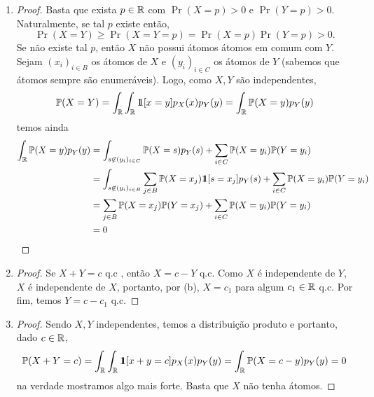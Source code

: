 \begin{enumerate}[label=(\alph*)]
	\item
		\begin{proof}
			Basta que exista $p \in \mathbb{R}$ com $\Pr(X = p) > 0$ e $\Pr(Y = p) >
			0$. Naturalmente,
			se tal $p$ existe então,
			\[
				\Pr(X = Y) \geq \Pr(X = Y = p) = \Pr(X=p) \Pr(Y = p) > 0.
			\]
			Se não existe tal $p$, então $X$ não possui átomos átomos em comum com $Y$.
			Sejam $(x_i)_{i \in B}$ os átomos de $X$ e $(y_i)_{i \in C}$ os
			átomos de $Y$ (sabemos que átomos sempre são enumeráveis).
			Logo, como $X,Y$ são independentes,
			\[
				\mathbb{P}(X = Y) = \int_{\mathbb{R}}\int_{\mathbb{R}} \hbox{$1\mkern-6.5mu1$}[x = y] p_X(x) p_Y(y) =
				\int_{\mathbb{R}} \mathbb{P}(X = y) p_Y(y)
			\]
			temos ainda
			\begin{align*}
				\int_{\mathbb{R}} \mathbb{P}(X = y) p_Y(y) &= \int_{s \not \in (y_i)_{i \in C}}
				\mathbb{P}(X = s) p_Y(s) + \sum_{i \in C} \mathbb{P}(X = y_i)\mathbb{P}(Y = y_i)\\
				&=\int_{s \not \in (y_i)_{i \in B}} \sum_{j \in B}\mathbb{P}(X =
				x_j)\hbox{$1\mkern-6.5mu1$}[s = x_j] p_Y(s) + \sum_{i \in C} \mathbb{P}(X = y_i)\mathbb{P}(Y = y_i)\\
				&=\sum_{j \in B} \mathbb{P}(X = x_j)\mathbb{P}(Y = x_j) + \sum_{i \in C} \mathbb{P}(X
				= y_i)\mathbb{P}(Y = y_i)\\
				&= 0
			\end{align*}

		\end{proof}

	\item
		\begin{proof}
			Se $X+Y = c$ q.c , então $X = c - Y$ q.c. Como $X$ é independente de $Y$,
			$X$ é independente de $X$, portanto, por (b), $X = c_1$ para algum
			$c_1 \in \mathbb{R}$ q.c.
			Por fim, temos $Y = c - c_1$ q.c.
		\end{proof}

	\item
		\begin{proof}
			Sendo $X,Y$ independentes, temos a distribuição produto e portanto,
			dado $c \in \mathbb{R}$,
			\[
				\mathbb{P}(X + Y = c) = \int_{\mathbb{R}}\int_{\mathbb{R}} \hbox{$1\mkern-6.5mu1$}[x + y = c] p_X(x)p_Y(y) =
				\int_{\mathbb{R}} \mathbb{P}(X = c - y) p_Y(y) = 0
			\]
			na verdade mostramos algo mais forte. Basta que $X$ não tenha átomos.
		\end{proof}
\end{enumerate}

